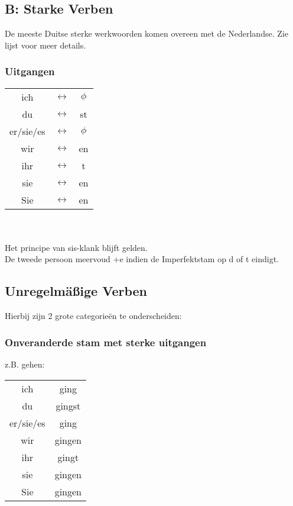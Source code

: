 \documentclass[main.tex]{subfiles}
\begin{document}
\subsection{B: Starke Verben}
De meeste Duitse sterke werkwoorden komen overeen met de Nederlandse. Zie lijst voor meer details.
\subsubsection{Uitgangen}
\begin{tabular}{c c c}

ich & $\leftrightarrow$ & $\phi$ \\ 

du & $\leftrightarrow$ & st \\ 

er/sie/es & $\leftrightarrow$ & $\phi$ \\ 

wir & $\leftrightarrow$ & en \\ 

ihr & $\leftrightarrow$ & t \\ 

sie & $\leftrightarrow$ & en \\ 
 
Sie & $\leftrightarrow$ & en \\ 

\end{tabular}
\\
\\
Het principe van sis-klank blijft gelden.\\
De tweede persoon meervoud +e indien de Imperfektstam op d of t eindigt.
\subsection{Unregelmäßige Verben}
Hierbij zijn 2 grote categorieën te onderscheiden:
\subsubsection{Onveranderde stam met sterke uitgangen}
z.B. gehen:
\begin{tabular}{cc}

ich & ging \\ 

du & gingst \\ 

er/sie/es & ging \\ 

wir & gingen \\ 

ihr & gingt \\ 
 
sie & gingen \\ 
Sie & gingen \\ 
\end{tabular} 
\end{document}
